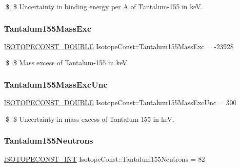 \$ \$ Uncertainty in binding energy per A of Tantalum-\/155 in keV. \mbox{\label{group___isotope_const-_tantalum-_ta155_gab3fb35886370a6f71f4e3a75efc75ebe}} 
\subsubsection{\texorpdfstring{Tantalum155\+Mass\+Exc}{Tantalum155MassExc}}
{\footnotesize\ttfamily \mbox{\hyperlink{group___isotope_const-_macros_ga8f45a7272ce02c0b4c65c44636ed719a}{I\+S\+O\+T\+O\+P\+E\+C\+O\+N\+S\+T\+\_\+\+D\+O\+U\+B\+LE}} Isotope\+Const\+::\+Tantalum155\+Mass\+Exc = -\/23928}

\$ \$ Mass excess of Tantalum-\/155 in keV. \mbox{\label{group___isotope_const-_tantalum-_ta155_gab644ad9192ec2937d5401342df300258}} 
\subsubsection{\texorpdfstring{Tantalum155\+Mass\+Exc\+Unc}{Tantalum155MassExcUnc}}
{\footnotesize\ttfamily \mbox{\hyperlink{group___isotope_const-_macros_ga8f45a7272ce02c0b4c65c44636ed719a}{I\+S\+O\+T\+O\+P\+E\+C\+O\+N\+S\+T\+\_\+\+D\+O\+U\+B\+LE}} Isotope\+Const\+::\+Tantalum155\+Mass\+Exc\+Unc = 300}

\$ \$ Uncertainty in mass excess of Tantalum-\/155 in keV. \mbox{\label{group___isotope_const-_tantalum-_ta155_ga61d35d071ed650514a9e506d11accb1d}} 
\subsubsection{\texorpdfstring{Tantalum155\+Neutrons}{Tantalum155Neutrons}}
{\footnotesize\ttfamily \mbox{\hyperlink{group___isotope_const-_macros_ga5f18360b3e99483a35c32d789e62621c}{I\+S\+O\+T\+O\+P\+E\+C\+O\+N\+S\+T\+\_\+\+I\+NT}} Isotope\+Const\+::\+Tantalum155\+Neutrons = 82}

